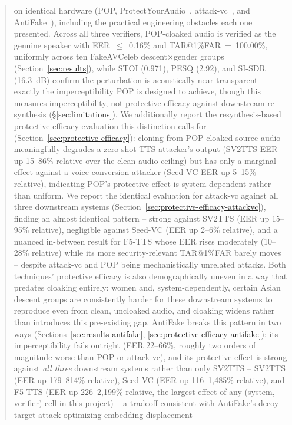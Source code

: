 \documentclass[11pt]{article}
\begin{document}
\begin{abstract}
on identical hardware (POP, ProtectYourAudio~\cite{liu2023protecting},
attack-vc~\cite{huang2021defending}, and
AntiFake~\cite{yu2023antifake}), including the practical engineering
obstacles each one presented. Across all three verifiers, POP-cloaked
audio is verified as the genuine speaker with EER~$\leq$~0.16\% and
TAR@1\%FAR~=~100.00\%, uniformly across ten FakeAVCeleb
descent$\times$gender groups (Section~\ref{sec:results}), while STOI
(0.971), PESQ (2.92), and SI-SDR (16.3~dB) confirm the perturbation
is acoustically near-transparent -- exactly the imperceptibility
POP is designed to achieve, though this measures imperceptibility, not
protective efficacy against downstream re-synthesis
(\S\ref{sec:limitations}). We additionally report the resynthesis-based
protective-efficacy evaluation this distinction calls for
(Section~\ref{sec:protective-efficacy}): cloning from POP-cloaked
source audio meaningfully degrades a zero-shot TTS attacker's output
(SV2TTS EER up 15--86\% relative over the clean-audio ceiling) but has
only a marginal effect against a voice-conversion attacker (Seed-VC
EER up 5--15\% relative), indicating POP's protective effect is
system-dependent rather than uniform. We report the identical
evaluation for attack-vc against all three downstream systems
(Section~\ref{sec:protective-efficacy-attackvc}), finding an almost
identical pattern -- strong against SV2TTS (EER up 15--95\% relative),
negligible against Seed-VC (EER up 2--6\% relative), and a nuanced
in-between result for F5-TTS whose EER rises moderately (10--28\%
relative) while its more security-relevant TAR@1\%FAR barely moves --
despite attack-vc and POP being mechanistically unrelated attacks. Both
techniques' protective efficacy is also demographically uneven in a
way that predates cloaking entirely: women and, system-dependently,
certain Asian descent groups are consistently harder for these
downstream systems to reproduce even from clean, uncloaked audio, and
cloaking widens rather than introduces this pre-existing gap. AntiFake
breaks this pattern in two ways (Sections~\ref{sec:results-antifake},
\ref{sec:protective-efficacy-antifake}): its imperceptibility fails
outright (EER 22--66\%, roughly two orders of magnitude worse than POP
or attack-vc), and its protective effect is strong against \emph{all
three} downstream systems rather than only SV2TTS -- SV2TTS (EER up
179--814\% relative), Seed-VC (EER up 116--1{,}485\% relative), and
F5-TTS (EER up 226--2{,}199\% relative, the largest effect of any
(system, verifier) cell in this project) -- a tradeoff consistent with
AntiFake's decoy-target attack optimizing embedding displacement

\end{abstract}
\end{document}
